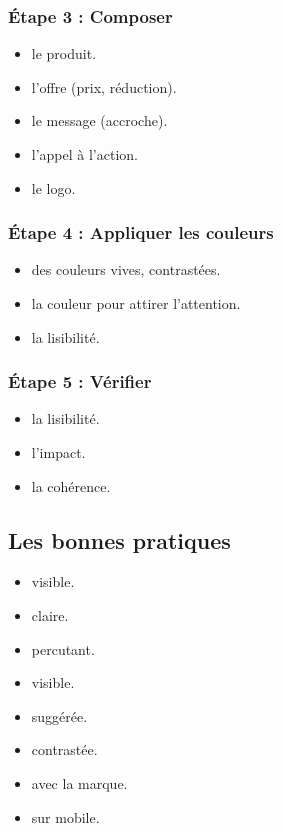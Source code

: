 \subsubsection{Étape 3 : Composer}

\begin{itemize}
    \item {} le produit.
    \item {} l'offre (prix, réduction).
    \item {} le message (accroche).
    \item {} l'appel à l'action.
    \item {} le logo.
\end{itemize}

\subsubsection{Étape 4 : Appliquer les couleurs}

\begin{itemize}
    \item {} des couleurs vives, contrastées.
    \item {} la couleur pour attirer l'attention.
    \item {} la lisibilité.
\end{itemize}

\subsubsection{Étape 5 : Vérifier}

\begin{itemize}
    \item {} la lisibilité.
    \item {} l'impact.
    \item {} la cohérence.
\end{itemize}

\subsection{Les bonnes pratiques}

\begin{itemize}
    \item {} visible.
    \item {} claire.
    \item {} percutant.
    \item {} visible.
    \item {} suggérée.
    \item {} contrastée.
    \item {} avec la marque.
    \item {} sur mobile.
\end{itemize}

